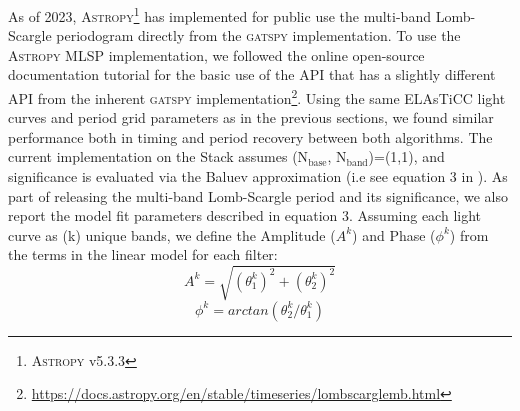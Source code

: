 \documentclass[DM,authoryear,toc]{lsstdoc}
\begin{document}
As of 2023, \textsc{Astropy}\footnote{\textsc{Astropy} v5.3.3} has implemented for public use the multi-band Lomb-Scargle periodogram directly from the \textsc{gatspy} implementation. To use the \textsc{Astropy} MLSP implementation, we followed the online open-source documentation tutorial for the basic use of the API that has a slightly different API from the inherent \textsc{gatspy} implementation\footnote{\href{https://docs.astropy.org/en/stable/timeseries/lombscarglemb.html}{https://docs.astropy.org/en/stable/timeseries/lombscarglemb.html}}. Using the same  ELAsTiCC light curves and period grid parameters as in the previous sections, we found similar performance both in timing and period recovery between both algorithms. The current implementation on the Stack assumes (N$_{\text{base}}$, N$_{\text{band}}$)=(1,1), and significance is evaluated via the Baluev approximation (i.e see equation 3 in \citet{Suveges:Suveges15}). As part of releasing the multi-band Lomb-Scargle period and its significance, we also report the model fit parameters described in equation 3. Assuming each light curve as (k) unique bands, we define the Amplitude ($A^{k}$) and Phase ($\phi^{k}$) from the terms in the linear model for each filter: 
\begin{equation}
A^{k} = \sqrt{(\theta_{1}^{k})^2 + (\theta_{2}^{k})^2}
\end{equation}
\begin{equation}
\phi^{k} = arctan(\theta_2^{k}/\theta_{1}^{k})
\end{equation}
\end{document}
